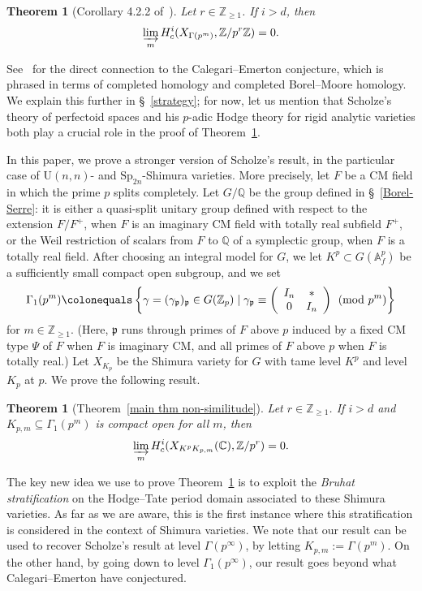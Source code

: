 \documentclass{amsart}
\newtheorem{thm}[subsubsection]{Theorem}
\theoremstyle{remark}
\numberwithin{equation}{subsection}
\newcommand{\A}{\AA}
\def\C{\CC}
\newcommand{\Q}{\QQ}
\newcommand{\Z}{\ZZ}
\newcommand{\p}{\frakp}
\renewcommand{\AA}{{\mathbb A}}
\newcommand{\CC}{{\mathbb C}}
\newcommand{\QQ}{{\mathbb Q}}
\newcommand{\ZZ}{{\mathbb Z}}
\newcommand{\frakp}{\mathfrak{p}}
\newcommand{\sub}{\subseteq}
\newcommand{\defeq}{\colonequals}
\renewcommand{\(}{\left(}
\renewcommand{\)}{\right)}
\begin{document}
\begin{thm}[Corollary 4.2.2 of~\cite{scholze-galois}]\label{scholze's thm} Let $r\in \Z_{\geq 1}$. If $i>d$, then 
\[
\varinjlim_{m} H^i_c(X_{\Gamma(p^m)}, \Z/p^r\Z) = 0. 
\] 
\end{thm}

\noindent See~\cite[Cor. 4.2.3]{scholze-galois} for the direct connection to the Calegari--Emerton conjecture, which is phrased in terms of completed homology and completed Borel--Moore homology. We explain this further in \S~\ref{strategy}; for now, let us mention that Scholze's theory of perfectoid spaces and his $p$-adic Hodge theory for rigid analytic varieties both play a crucial role in the proof of Theorem~\ref{scholze's thm}. 

In this paper, we prove a stronger version of Scholze's result, in the particular case of $\mathrm{U}(n,n)$- and $\mathrm{Sp}_{2n}$-Shimura varieties. More precisely, let $F$ be a CM field in which the prime $p$ splits completely. Let $G/\Q$ be the group defined in \S~\ref{Borel-Serre}: it is either a quasi-split unitary group defined with respect to the extension $F/F^+$, when $F$ is an imaginary CM field with totally real subfield $F^+$, or the Weil restriction of scalars from $F$ to $\Q$ of a symplectic group, when $F$ is a totally real field. After choosing an integral model for $G$, we 
let $K^p\subset G(\A^p_f)$ be a sufficiently small compact open subgroup,
and we set
\[
\Gamma_1(p^m)\defeq \left\{\gamma=(\gamma_{\p})_{\p}\in G(\Z_p)\mid \gamma_{\p}\equiv \left(\begin{array}{cc} I_n  & * \\ 0 & I_n \end{array}\right)\pmod{p^m}\right\}
\] 
for $m\in \Z_{\geq 1}$. (Here, $\frakp$ runs through primes of $F$ above $p$ induced by a fixed CM type $\Psi$ of $F$ when $F$ is imaginary CM, and all primes of $F$ above $p$ when $F$ is totally real.) 
Let $X_{K_p}$ be the Shimura variety for $G$ with tame level $K^p$ and level $K_p$ at $p$. We prove the following result. 

\begin{thm}[Theorem~\ref{main thm non-similitude}]\label{unified main theorem} 
Let $r\in \Z_{\geq 1}$. If $i>d$ and $K_{p,m} \sub \Gamma_1(p^m)$ is compact open for all $m$, then 
\[
 \varinjlim_{m} H^{i}_{c}(X_{K^p K_{p,m}}(\C),\Z/p^r)=0.
 \]
\end{thm}

\noindent The key new idea we use to prove Theorem~\ref{unified main theorem} is to exploit the \emph{Bruhat stratification} on the Hodge--Tate period domain associated to these Shimura varieties. As far as we are aware, this is the first instance where this stratification is considered in the context of Shimura varieties. We note that our result can be used to recover Scholze's result at level $\Gamma(p^\infty)$, by letting $K_{p,m}:=\Gamma(p^m)$. 
On the other hand, by going down to level $\Gamma_1(p^\infty)$, our result goes beyond what Calegari--Emerton have conjectured.   
\end{document}
